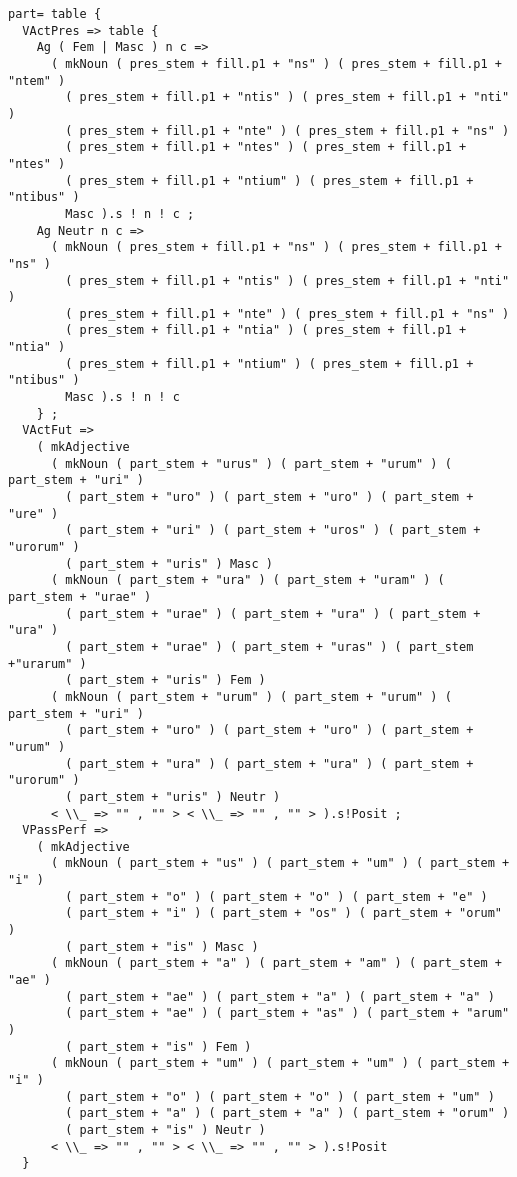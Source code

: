 \begin{lstlisting}[float=h!tp,caption={Ausschnitt aus der Funktion \texttt{mkVerb} um Infinitiv-Verbformen zu bilden (vgl. \textbf{ResLat.gf})},label={GF-Res-MkVerb-Part},basicstyle=\small]
part= table {
  VActPres => table {
    Ag ( Fem | Masc ) n c => 
      ( mkNoun ( pres_stem + fill.p1 + "ns" ) ( pres_stem + fill.p1 + "ntem" ) 
        ( pres_stem + fill.p1 + "ntis" ) ( pres_stem + fill.p1 + "nti" ) 
        ( pres_stem + fill.p1 + "nte" ) ( pres_stem + fill.p1 + "ns" ) 
        ( pres_stem + fill.p1 + "ntes" ) ( pres_stem + fill.p1 + "ntes" ) 
        ( pres_stem + fill.p1 + "ntium" ) ( pres_stem + fill.p1 + "ntibus" ) 
        Masc ).s ! n ! c ;
    Ag Neutr n c =>
      ( mkNoun ( pres_stem + fill.p1 + "ns" ) ( pres_stem + fill.p1 + "ns" ) 
        ( pres_stem + fill.p1 + "ntis" ) ( pres_stem + fill.p1 + "nti" ) 
        ( pres_stem + fill.p1 + "nte" ) ( pres_stem + fill.p1 + "ns" ) 
        ( pres_stem + fill.p1 + "ntia" ) ( pres_stem + fill.p1 + "ntia" ) 
        ( pres_stem + fill.p1 + "ntium" ) ( pres_stem + fill.p1 + "ntibus" ) 
        Masc ).s ! n ! c
    } ;
  VActFut => 
    ( mkAdjective
      ( mkNoun ( part_stem + "urus" ) ( part_stem + "urum" ) ( part_stem + "uri" ) 
        ( part_stem + "uro" ) ( part_stem + "uro" ) ( part_stem + "ure" ) 
        ( part_stem + "uri" ) ( part_stem + "uros" ) ( part_stem + "urorum" ) 
        ( part_stem + "uris" ) Masc )
      ( mkNoun ( part_stem + "ura" ) ( part_stem + "uram" ) ( part_stem + "urae" )
        ( part_stem + "urae" ) ( part_stem + "ura" ) ( part_stem + "ura" )
        ( part_stem + "urae" ) ( part_stem + "uras" ) ( part_stem +"urarum" ) 
        ( part_stem + "uris" ) Fem )
      ( mkNoun ( part_stem + "urum" ) ( part_stem + "urum" ) ( part_stem + "uri" ) 
        ( part_stem + "uro" ) ( part_stem + "uro" ) ( part_stem + "urum" ) 
        ( part_stem + "ura" ) ( part_stem + "ura" ) ( part_stem + "urorum" ) 
        ( part_stem + "uris" ) Neutr )
      < \\_ => "" , "" > < \\_ => "" , "" > ).s!Posit ;
  VPassPerf => 
    ( mkAdjective
      ( mkNoun ( part_stem + "us" ) ( part_stem + "um" ) ( part_stem + "i" ) 
        ( part_stem + "o" ) ( part_stem + "o" ) ( part_stem + "e" ) 
        ( part_stem + "i" ) ( part_stem + "os" ) ( part_stem + "orum" ) 
        ( part_stem + "is" ) Masc )
      ( mkNoun ( part_stem + "a" ) ( part_stem + "am" ) ( part_stem + "ae" ) 
        ( part_stem + "ae" ) ( part_stem + "a" ) ( part_stem + "a" ) 
        ( part_stem + "ae" ) ( part_stem + "as" ) ( part_stem + "arum" ) 
        ( part_stem + "is" ) Fem )
      ( mkNoun ( part_stem + "um" ) ( part_stem + "um" ) ( part_stem + "i" ) 
        ( part_stem + "o" ) ( part_stem + "o" ) ( part_stem + "um" ) 
        ( part_stem + "a" ) ( part_stem + "a" ) ( part_stem + "orum" ) 
        ( part_stem + "is" ) Neutr ) 
      < \\_ => "" , "" > < \\_ => "" , "" > ).s!Posit
  }
\end{lstlisting}

